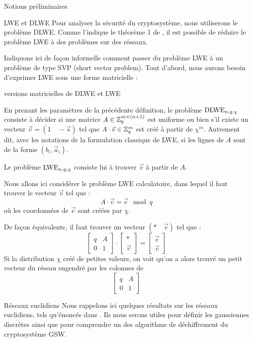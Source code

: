 \begin{section}{Notions préliminaires}
\begin{subsection}{LWE et DLWE}
	Pour analyser la sécurité du cryptosystème, nous utiliserons le problème DLWE. Comme l'indique le théorème 1 de \cite{C:GenSahWat13}, il est possible de réduire le problème LWE à des problèmes sur des réseaux.

	Indiquons ici de façon informelle comment passer du problème LWE à un problème de type SVP (short vector problem). Tout d'abord, nous aurons besoin d'exprimer LWE sous une forme matricielle :

	\begin{definition}{versions matricielles de DLWE et LWE}

	En prenant les paramètres de la précédente définition, le problème $\text{DLWE}_{n,q,\chi}$ consiste à décider si une matrice $A \in \mathbb{Z}_q^{m \times (n+1)}$ est uniforme ou bien s'il existe un vecteur $\vec{v} = (1\quad -\vec{s})$ tel que $A \cdot \vec{v} \in \mathbb{Z}_q^{m}$ est créé à partir de $\chi^m$. Autrement dit, avec les notations de la formulation classique de LWE, si les lignes de $A$ sont de la forme $(b_i, \vec{a}_i)$.
	
	Le problème $\text{LWE}_{n,q,\chi}$ consiste lui à trouver $\vec{v}$ à partir de $A$.
	\end{definition}

	Nous allons ici considérer le problème LWE calculatoire, dans lequel il faut trouver le vecteur $\vec{v}$ tel que :
	\[ A\cdot \vec{v} = \vec{e} \mod q \]
	où les coordonnées de $\vec{e}$ sont créées par $\chi$.

	De façon équivalente, il faut trouver un vecteur $(*\quad\vec{v})$ tel que :
	\[ \begin{bmatrix}q & A \\ 0 &1 \end{bmatrix}\cdot
	   \begin{bmatrix}* \\ \vec{v} \end{bmatrix} =
	   \begin{bmatrix} \vec{e} \\ \vec{v} \end{bmatrix} \]
	Si la distribution $\chi$ créé de petites valeurs, on voit qu'on a alors trouvé un \og petit \fg vecteur du réseau engendré par les colonnes de 
	\[ \begin{bmatrix}q & A \\ 0 &1 \end{bmatrix} \]
	\end{subsection}

	\begin{subsection}{Réseaux euclidiens}
	Nous rappelons ici quelques résultats sur les réseaux euclidiens, tels qu'énoncés dans \cite{EC:MicPei12}. Ils nous serons utiles pour définir les gaussiennes discrètes ainsi que pour comprendre un des algorithme de déchiffrement du cryptosystème GSW.


\end{subsection}
\end{section}
